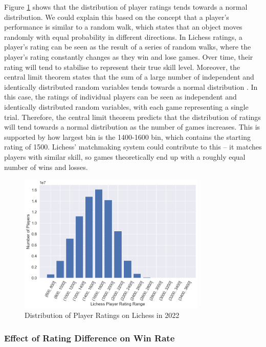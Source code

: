 \documentclass[a4paper, 11pt]{article}
\begin{document}
Figure \ref{fig:distributionOfPlayerRatings} shows that the distribution of player ratings tends towards a normal distribution. We could explain this based on the concept that a player's performance is similar to a random walk, which states that an object moves randomly with equal probability in different directions. In Lichess ratings, a player's rating can be seen as the result of a series of random walks, where the player's rating constantly changes as they win and lose games. Over time, their rating will tend to stabilise to represent their true skill level. Moreover, the central limit theorem states that the sum of a large number of independent and identically distributed random variables tends towards a normal distribution \cite{le1986central}. In this case, the ratings of individual players can be seen as independent and identically distributed random variables, with each game representing a single trial. Therefore, the central limit theorem predicts that the distribution of ratings will tend towards a normal distribution as the number of games increases. This is supported by how largest bin is the 1400-1600 bin, which contains the starting rating of 1500. Lichess' matchmaking system could contribute to this -- it matches players with similar skill, so games theoretically end up with a roughly equal number of wins and losses.

\begin{figure}[H]
    \centering
    \caption{Distribution of Player Ratings on Lichess in 2022}
    \label{fig:distributionOfPlayerRatings}
    \includegraphics[width=0.8\textwidth]{Distribution of Player Ratings.png}
\end{figure}

\subsubsection{Effect of Rating Difference on Win Rate}
\end{document}
